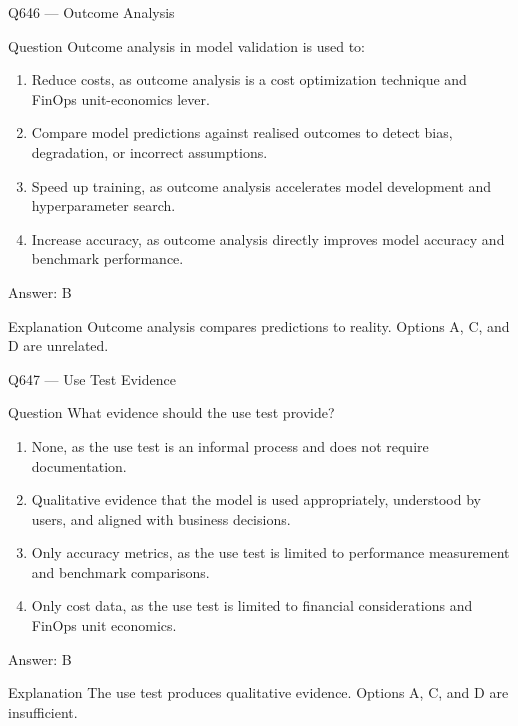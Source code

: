 \documentclass[aspectratio=169,8pt]{beamer}
\begin{document}
	\begin{frame}{Q646 --- Outcome Analysis}
		\begin{block}{Question}
			Outcome analysis in model validation is used to:
			\begin{enumerate}
				\item Reduce costs, as outcome analysis is a cost optimization technique and FinOps unit-economics lever.
				\item Compare model predictions against realised outcomes to detect bias, degradation, or incorrect assumptions.
				\item Speed up training, as outcome analysis accelerates model development and hyperparameter search.
				\item Increase accuracy, as outcome analysis directly improves model accuracy and benchmark performance.
			\end{enumerate}
		\end{block}
		\begin{exampleblock}{Answer: B}\end{exampleblock}
		\begin{block}{Explanation}
			Outcome analysis compares predictions to reality. Options A, C, and D are unrelated.
		\end{block}
	\end{frame}
	
	\begin{frame}{Q647 --- Use Test Evidence}
		\begin{block}{Question}
			What evidence should the use test provide?
			\begin{enumerate}
				\item None, as the use test is an informal process and does not require documentation.
				\item Qualitative evidence that the model is used appropriately, understood by users, and aligned with business decisions.
				\item Only accuracy metrics, as the use test is limited to performance measurement and benchmark comparisons.
				\item Only cost data, as the use test is limited to financial considerations and FinOps unit economics.
			\end{enumerate}
		\end{block}
		\begin{exampleblock}{Answer: B}\end{exampleblock}
		\begin{block}{Explanation}
			The use test produces qualitative evidence. Options A, C, and D are insufficient.
		\end{block}
	\end{frame}
	
\end{document}
